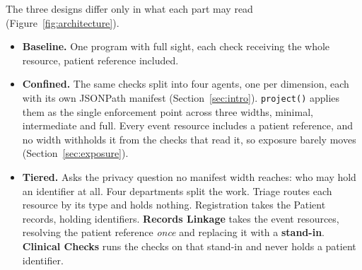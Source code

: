 \begin{figure}[htbp]
\end{figure}

The three designs differ only in what each part may read (Figure~\ref{fig:architecture}).

\begin{itemize}[leftmargin=1.4em, itemsep=0.15em]
  \item \textbf{Baseline.} One program with full sight, each check receiving the whole resource,
        patient reference included.
  \item \textbf{Confined.} The same checks split into four agents, one per dimension, each with its
        own JSONPath manifest (Section~\ref{sec:intro}). \texttt{project()} applies them as the
        single enforcement point across three widths, minimal, intermediate and full. Every event
        resource includes a patient reference, and no width withholds it from the checks that read
        it, so exposure barely moves (Section~\ref{sec:exposure}).
  \item \textbf{Tiered.} Asks the privacy question no manifest width reaches: who may hold an
        identifier at all. Four departments split the work. Triage routes each resource by its type
        and holds nothing. Registration takes the Patient records, holding identifiers.
        \textbf{Records Linkage} takes the event resources, resolving the patient reference
        \emph{once} and replacing it with a \textbf{stand-in}. \textbf{Clinical Checks} runs the
        checks on that stand-in and never holds a patient identifier.
\end{itemize}

